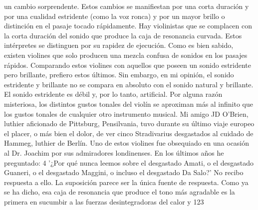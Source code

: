 un cambio sorprendente. Estos cambios se manifiestan por una corta duración y por una cualidad estridente (como la voz ronca) y por un mayor brillo o distinción en el pasaje tocado rápidamente.
Hay violinistas que se complacen con la corta duración del sonido que produce la caja de resonancia curvada. Estos intérpretes se distinguen por su rapidez de ejecución. Como es bien sabido, existen violines que solo producen una mezcla confusa de sonidos en los pasajes rápidos. Comparando estos violines con aquellos que poseen un sonido estridente pero brillante, prefiero estos últimos. Sin embargo, en mi opinión, el sonido estridente y brillante no se compara en absoluto con el sonido natural y brillante. El sonido estridente es débil y, por lo tanto, artificial.
Por alguna razón misteriosa, los distintos gustos tonales del violín se aproximan más al infinito que los gustos tonales de cualquier otro instrumento musical.
Mi amigo JD O'Brien, luthier aficionado de Pittsburg, Pensilvania, tuvo durante su último viaje europeo el placer, o más bien el dolor, de ver cinco Stradivarius desgastados al cuidado de Hammeg, luthier de Berlín. Uno de estos violines fue obsequiado en una ocasión al Dr. Joachim por sus admiradores londinenses.
En los últimos años he preguntado: 4 '¿Por qué nunca leemos sobre el desgastado Amati, o el desgastado Guaneri, o el desgastado Maggini, o incluso el desgastado Da Salo?' No recibo respuesta a ello. La suposición parece ser la única fuente de respuesta. Como ya se ha dicho, esa caja de resonancia que produce el tono más agradable es la primera en sucumbir a las fuerzas desintegradoras del calor y
123


